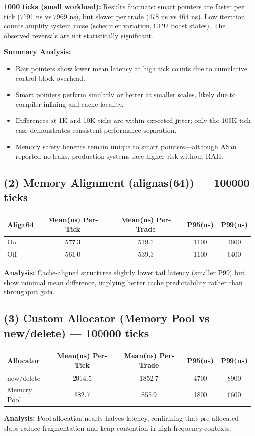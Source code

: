 \documentclass[a4paper,12pt]{article}
\begin{document}
\textbf{1000 ticks (small workload):}
Results fluctuate: smart pointers are faster per tick (7791 ns vs 7969 ns), but slower per trade (478 ns vs 464 ns). 
Low iteration counts amplify system noise (scheduler variation, CPU boost states). The observed reversals are not statistically significant.

\textbf{Summary Analysis:}
\begin{itemize}
  \item Raw pointers show lower mean latency at high tick counts due to cumulative control-block overhead.
  \item Smart pointers perform similarly or better at smaller scales, likely due to compiler inlining and cache locality.
  \item Differences at 1K and 10K ticks are within expected jitter; only the 100K tick case demonstrates consistent performance separation.
  \item Memory safety benefits remain unique to smart pointers—although ASan reported no leaks, production systems face higher risk without RAII.
\end{itemize}

\subsection*{(2) Memory Alignment (alignas(64)) — 100000 ticks}
\begin{center}
\begin{tabular}{lcccc}
\toprule
Align64 & Mean(ns) Per-Tick & Mean(ns) Per-Trade & P95(ns) & P99(ns) \\
\midrule
On & 577.3 & 519.3 & 1100 & 4600 \\
Off & 561.0 & 539.3 & 1100 & 6400 \\
\bottomrule
\end{tabular}
\end{center}
\textbf{Analysis:} Cache-aligned structures slightly lower tail latency (smaller P99) but show minimal mean difference, implying better cache predictability rather than throughput gain.

\subsection*{(3) Custom Allocator (Memory Pool vs new/delete) — 100000 ticks}
\begin{center}
\begin{tabular}{lcccc}
\toprule
Allocator & Mean(ns) Per-Tick & Mean(ns) Per-Trade & P95(ns) & P99(ns) \\
\midrule
new/delete & 2014.5 & 1852.7 & 4700 & 8900 \\
Memory Pool & 882.7 & 855.9 & 1800 & 6600 \\
\bottomrule
\end{tabular}
\end{center}
\textbf{Analysis:} Pool allocation nearly halves latency, confirming that pre-allocated slabs reduce fragmentation and heap contention in high-frequency contexts.
\end{document}
